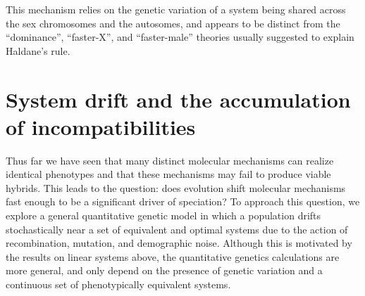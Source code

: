 \documentclass{article}
\newcommand{\plr}[1]{\todo[color=blue!25]{#1}}
\newcommand{\plr}[1]{{\color{blue}\it #1}}
\newcommand{\1}{\mathbbm{1}}
\begin{document}
This mechanism relies on the genetic variation of a system being shared across the sex chromosomes and the autosomes,
and appears to be distinct from the ``dominance'', ``faster-X'', and ``faster-male'' theories \citep{orr1997haldane, coyne1998evolutionary, turelli1995dominance} usually suggested to explain Haldane's rule.

\section*{System drift and the accumulation of incompatibilities}

Thus far we have seen that many distinct molecular mechanisms can realize identical phenotypes
and that these mechanisms may fail to produce viable hybrids.
This leads to the question: does evolution shift molecular mechanisms
fast enough to be a significant driver of speciation?
To approach this question,
we explore a general quantitative genetic model in which a population drifts stochastically
near a set of equivalent and optimal systems
due to the action of recombination, mutation, and demographic noise.
Although this is motivated by the results on linear systems above,
the quantitative genetics calculations are more general,
and only depend on the presence of genetic variation and a continuous set of phenotypically equivalent systems.
\end{document}
